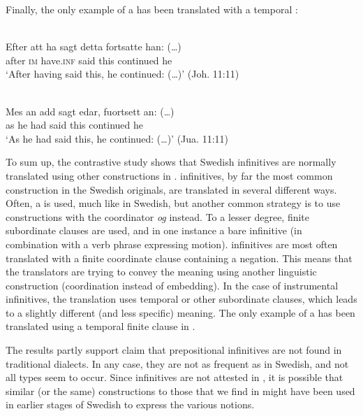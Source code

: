 \documentclass[output=paper]{langscibook}
\begin{document}
Finally, the only example of a  has been translated with a temporal : 


\ea
\label{ex:kalm:30}
\ea {}\label{ex:kalm:30a}\\ 
\gll Efter att ha sagt detta fortsatte han: (…)\\
 after \textsc{im} have.\textsc{inf} said this continued he\\
\glt ‘After having said this, he continued: (…)’ (Joh. 11:11)

\ex {}\label{ex:kalm:30b}\\
\gll Mes an add sagt edar, fuortsett an: (…)\\
 as he had said this continued he\\
\glt ‘As he had said this, he continued: (…)’ (Jua. 11:11)
\z
\z 


To sum up, the contrastive study shows that Swedish  infinitives are normally translated using other constructions in .  infinitives, by far the most common construction in the Swedish originals, are translated in several different ways. Often, a  is used, much like in Swedish, but another common strategy is to use constructions with the coordinator \textit{og} instead. To a lesser degree, finite subordinate clauses are used, and in one instance a bare infinitive (in combination with a verb phrase expressing motion).  infinitives are most often translated with a finite coordinate clause containing a negation. This means that the translators are trying to convey the  meaning using another linguistic construction (coordination instead of embedding). In the case of instrumental infinitives, the translation uses temporal or other subordinate clauses, which leads to a slightly different (and less specific) meaning. The only example of a  has been translated using a temporal finite clause in . 

The results partly support  claim that prepositional infinitives are not found in traditional dialects. In any case, they are not as frequent as in Swedish, and not all types seem to occur. Since  infinitives are not attested in , it is possible that similar (or the same) constructions to those that we find in  might have been used in earlier stages of Swedish to express the various  notions. 
\end{document}
